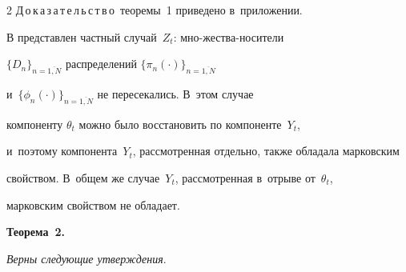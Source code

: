 \begin{multicols}{2}
Д\,о\,к\,а\,з\,а\,т\,е\,л\,ь\,с\,т\,в\,о\ тео\-ре\-мы~1 приведено в~приложении.





\smallskip





В \cite{B_04_1} представлен частный случай~$Z_t$: мно-\linebreak жест\-ва-но\-си\-те\-ли 


$\{D_n\}_{n=\overline{1,N}}$ распределений $\{\pi_n(\cdot)\}_{n=\overline{1,N}}$ 


и~$\{\phi_n(\cdot)\}_{n=\overline{1,N}}$ не пересекались. В~этом случае 


компоненту $\theta_t$ можно было восстановить по компоненте~$Y_t$,


и~поэтому компонента~$Y_t$, рассмотренная отдельно, также обладала марковским 


свойством. В~общем же случае~$Y_t$, рассмотренная в~отрыве от~$\theta_t$, 


марковским свойством не обладает.








\smallskip





\noindent


\textbf{Теорема~2.}




\textit{Верны следующие утверждения}.


\end{multicols}
